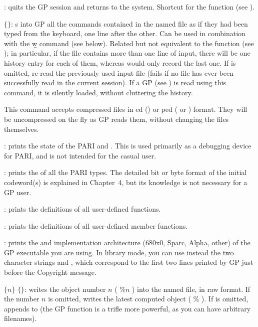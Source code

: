 : quits the GP session and returns to the system.
Shortcut for the function  (see ).

 $\{$$\}$: s into GP all the commands
contained in the named file as if they had been typed from the keyboard, one
line after the other. Can be used in combination with the \b{w} command (see
below). Related but not equivalent to the function  (see
); in particular, if the file contains more than one line of
input, there will be one history entry for each of them, whereas 
would only record the last one. If  is omitted, re-read the
previously used input file (fails if no file has ever been successfully read
in the current session). If a GP  (see )
is read using this command, it is silently loaded, without cluttering the
history.

\unix This command accepts compressed files in ed ()
or ped ( or ) format. They will be uncompressed on
the fly as GP reads them, without changing the files themselves.

: prints the state of the PARI  and .
This is used primarily as a debugging device for PARI, and is not intended
for the casual user.

: prints the  of all the PARI
types. The detailed bit or byte format of the initial codeword(s) is
explained in Chapter~4, but its knowledge is not necessary for a GP user.

: prints the definitions of all user-defined functions.

: prints the definitions of all user-defined member functions.

: prints the  and implementation architecture
(680x0, Sparc, Alpha, other) of the GP executable you are using. In library
mode, you can use instead the two character strings  and
, which correspond to the first two lines printed by GP just
before the Copyright message.

 $\{n\}$ $\{$$\}$: writes the object number
$n$ ( $\%n$ ) into the named file, in raw format. If the number $n$ is
omitted, writes the latest computed object ( $\%$ ). If  is
omitted, appends to  (the GP function  is a trifle more
powerful, as you can have arbitrary filenames).

